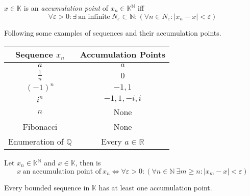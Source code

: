 \begin{definition}
   \(x \in \mathbb{K}\) is an \emph{accumulation point} of \(x_n \in \mathbb{K}^\mathbb{N}\) iff
   \[\forall \varepsilon > 0: \exists~\text{an infinite}~N_{\varepsilon} \subset \mathbb{N}: (\forall n \in N_\varepsilon: |x_n - x| < \varepsilon)\]
\end{definition}
\begin{example}
   Following some examples of sequences and their accumulation points.
   \begin{table}[h]\label{tbl:example_accumulation_points}
      \begin{center}
         \begin{tabular}{|c|c|}
            \hline
            Sequence \(x_n\)              & Accumulation Points        \\\hline
            \(a\)                         & \(a\)                      \\
            \(\frac{1}{n}\)               & \(0\)                      \\
            \((-1)^n\)                    & \(-1, 1\)                  \\
            \(i^n\)                       & \(-1, 1, -i, i\)           \\
            \(n\)                         & None                       \\
            Fibonacci                     & None                       \\
            Enumeration of \(\mathbb{Q}\) & Every \(a \in \mathbb{R}\) \\\hline
         \end{tabular}
      \end{center}
   \end{table}
\end{example}

\begin{theorem}
   Let \(x_n \in \mathbb{K}^\mathbb{N}\) and \(x \in \mathbb{K}\), then is
   \[x~\text{an accumulation point of}~x_n \iff \forall \varepsilon > 0: (\forall n \in \mathbb{N}~\exists m \geq n: |x_m - x| < \varepsilon)\]
\end{theorem}

\begin{theorem}\label{thm:bolzano}
   Every bounded sequence in \(\mathbb{K}\) has at least one accumulation point.
\end{theorem}


